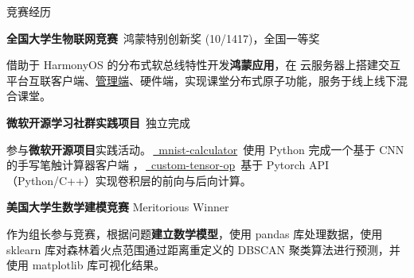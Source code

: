 \documentclass[a4paper]{article}
\newenvironment{cvitems}{
    \begin{justify}
    \begin{description}[
        labelwidth=2.0cm,
        leftmargin=2.5cm,
        labelsep=0.5cm,
        parsep=0pt,
        align=right
    ]
    
}{
    \end{description}
    \end{justify}
}
\def\githublink#1{\,\href{https://github.com/LogCreative/#1}{\faGithubSquare{}~\sffamily #1}\,}
\def\section#1{
    \noindent\hskip2.5cm \textsf{\large #1} \hrulefill
}
\def\tip#1{{\kaishu #1}~\vrule~}
\begin{document}
    \section{竞赛经历}
    \begin{cvitems}

        \item[2022.8] \textbf{全国大学生物联网竞赛}~鸿蒙特别创新奖 (10/1417)，全国一等奖
        
            借助于 HarmonyOS 的分布式软总线特性开发\textbf{鸿蒙应用}，在%
            云服务器上搭建交互平台互联客户端、\href{http://iot.logcreative.tech}{管理端}、硬件端，实现课堂分布式原子功能，服务于线上线下混合课堂。

        \item[2021.7] \textbf{微软开源学习社群实践项目}~独立完成
        
            参与\textbf{微软开源项目}实践活动。\githublink{mnist-calculator} 使用 Python 完成一个基于%
            CNN 的手写笔触计算器客户端%
            ，\githublink{custom-tensor-op} 基于 Pytorch API（Python/C++）实现卷积层的前向与后向计算。%

        \item[2021.4] \textbf{美国大学生数学建模竞赛} Meritorious Winner
        
            作为组长参与竞赛，根据问题\textbf{建立数学模型}，使用 \textsf{pandas} 库处理数据，使用 \textsf{sklearn} 库对森林着火点范围通过距离重定义的 DBSCAN 聚类算法进行预测，并使用 \textsf{matplotlib} 库可视化结果。

    \end{cvitems}
\end{document}
